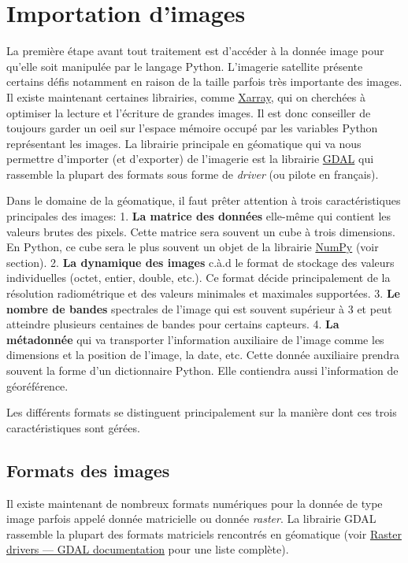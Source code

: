 \documentclass[
  11pt,
  letterpaper,
  open=any,
  twoside=false,
  french]{scrbook}
\begin{document}
\section{Importation d'images}\label{importation-dimages}

La première étape avant tout traitement est d'accéder à la donnée image
pour qu'elle soit manipulée par le langage Python. L'imagerie satellite
présente certains défis notamment en raison de la taille parfois très
importante des images. Il existe maintenant certaines librairies, comme
\href{https://docs.xarray.dev/en/stable/}{Xarray}, qui on cherchées à
optimiser la lecture et l'écriture de grandes images. Il est donc
conseiller de toujours garder un oeil sur l'espace mémoire occupé par
les variables Python représentant les images. La librairie principale en
géomatique qui va nous permettre d'importer (et d'exporter) de
l'imagerie est la librairie \href{https://gdal.org}{GDAL} qui rassemble
la plupart des formats sous forme de \emph{driver} (ou pilote en
français).

Dans le domaine de la géomatique, il faut prêter attention à trois
caractéristiques principales des images: 1. \textbf{La matrice des
données} elle-même qui contient les valeurs brutes des pixels. Cette
matrice sera souvent un cube à trois dimensions. En Python, ce cube sera
le plus souvent un objet de la librairie
\href{https://numpy.org/}{NumPy} (voir section). 2. \textbf{La dynamique
des images} c.à.d le format de stockage des valeurs individuelles
(octet, entier, double, etc.). Ce format décide principalement de la
résolution radiométrique et des valeurs minimales et maximales
supportées. 3. \textbf{Le nombre de bandes} spectrales de l'image qui
est souvent supérieur à 3 et peut atteindre plusieurs centaines de
bandes pour certains capteurs. 4. \textbf{La métadonnée} qui va
transporter l'information auxiliaire de l'image comme les dimensions et
la position de l'image, la date, etc. Cette donnée auxiliaire prendra
souvent la forme d'un dictionnaire Python. Elle contiendra aussi
l'information de géoréférence.

Les différents formats se distinguent principalement sur la manière dont
ces trois caractéristiques sont gérées.

\subsection{Formats des images}\label{formats-des-images}

Il existe maintenant de nombreux formats numériques pour la donnée de
type image parfois appelé donnée matricielle ou donnée \emph{raster}. La
librairie GDAL rassemble la plupart des formats matriciels rencontrés en
géomatique (voir
\href{https://gdal.org/en/latest/drivers/raster/index.html}{Raster
drivers --- GDAL documentation} pour une liste complète).
\end{document}
